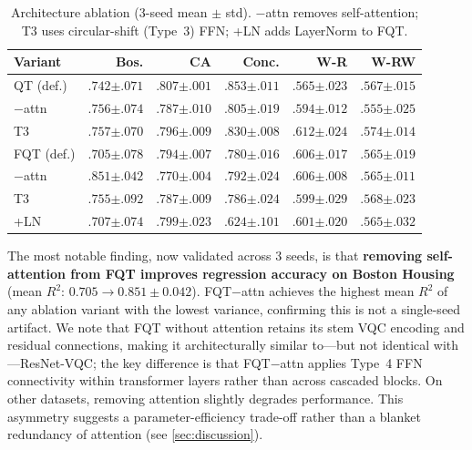\documentclass[10pt,conference]{IEEEtran}
\begin{document}
\begin{table}[t]
\centering
\caption{Architecture ablation (3-seed mean $\pm$ std). $-$attn removes self-attention; T3 uses circular-shift (Type~3) FFN; +LN adds LayerNorm to FQT.}
\label{tab:ablation}
\small
\begin{tabular}{lrrrrr}
\toprule
Variant & Bos. & CA & Conc. & W-R & W-RW \\
\midrule
QT (def.) & $.742{\scriptstyle\pm.071}$ & $.807{\scriptstyle\pm.001}$ & $.853{\scriptstyle\pm.011}$ & $.565{\scriptstyle\pm.023}$ & $.567{\scriptstyle\pm.015}$ \\
\quad $-$attn & $.756{\scriptstyle\pm.074}$ & $.787{\scriptstyle\pm.010}$ & $.805{\scriptstyle\pm.019}$ & $.594{\scriptstyle\pm.012}$ & $.555{\scriptstyle\pm.025}$ \\
\quad T3 & $.757{\scriptstyle\pm.070}$ & $.796{\scriptstyle\pm.009}$ & $.830{\scriptstyle\pm.008}$ & $.612{\scriptstyle\pm.024}$ & $\mathbf{.574}{\scriptstyle\pm.014}$ \\
\midrule
FQT (def.) & $.705{\scriptstyle\pm.078}$ & $.794{\scriptstyle\pm.007}$ & $.780{\scriptstyle\pm.016}$ & $.606{\scriptstyle\pm.017}$ & $.565{\scriptstyle\pm.019}$ \\
\quad $-$attn & $\mathbf{.851}{\scriptstyle\pm.042}$ & $.770{\scriptstyle\pm.004}$ & $.792{\scriptstyle\pm.024}$ & $.606{\scriptstyle\pm.008}$ & $.565{\scriptstyle\pm.011}$ \\
\quad T3 & $.755{\scriptstyle\pm.092}$ & $.787{\scriptstyle\pm.009}$ & $.786{\scriptstyle\pm.024}$ & $.599{\scriptstyle\pm.029}$ & $.568{\scriptstyle\pm.023}$ \\
\quad +LN & $.707{\scriptstyle\pm.074}$ & $.799{\scriptstyle\pm.023}$ & $.624{\scriptstyle\pm.101}$ & $.601{\scriptstyle\pm.020}$ & $.565{\scriptstyle\pm.032}$ \\
\bottomrule
\end{tabular}
\vspace{-10pt}
\end{table}

The most notable finding, now validated across 3 seeds, is that \textbf{removing self-attention from FQT improves regression accuracy on Boston Housing} (mean $R^2$: $0.705 \!\to\! 0.851 \pm 0.042$).
FQT$-$attn achieves the highest mean $R^2$ of any ablation variant with the lowest variance, confirming this is not a single-seed artifact.
We note that FQT without attention retains its stem VQC encoding and residual connections, making it architecturally similar to---but not identical with---ResNet-VQC; the key difference is that FQT$-$attn applies Type~4 FFN connectivity within transformer layers rather than across cascaded blocks.
On other datasets, removing attention slightly degrades performance.
This asymmetry suggests a parameter-efficiency trade-off rather than a blanket redundancy of attention (see \cref{sec:discussion}).
\end{document}
